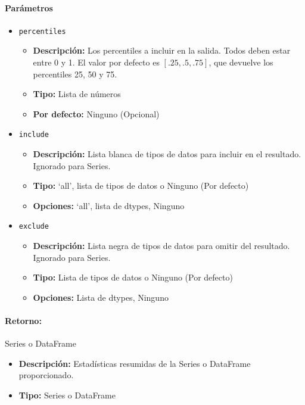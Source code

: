         \paragraph{\textbf{Parámetros}}
        \begin{itemize}
            \item \texttt{percentiles}
                \begin{itemize}
                    \item \textbf{Descripción:} Los percentiles a incluir en la salida. Todos deben estar entre 0 y 1. El valor por defecto es \([.25, .5, .75]\), que devuelve los percentiles 25, 50 y 75.
                    \item \textbf{Tipo:} Lista de números
                    \item \textbf{Por defecto:} Ninguno (Opcional)
                \end{itemize}
            \item \texttt{include}
                \begin{itemize}
                    \item \textbf{Descripción:} Lista blanca de tipos de datos para incluir en el resultado. Ignorado para Series.
                    \item \textbf{Tipo:} ‘all’, lista de tipos de datos o Ninguno (Por defecto)
                    \item \textbf{Opciones:} ‘all’, lista de dtypes, Ninguno
                \end{itemize}
            \item \texttt{exclude}
                \begin{itemize}
                    \item \textbf{Descripción:} Lista negra de tipos de datos para omitir del resultado. Ignorado para Series.
                    \item \textbf{Tipo:} Lista de tipos de datos o Ninguno (Por defecto)
                    \item \textbf{Opciones:} Lista de dtypes, Ninguno
                \end{itemize}
        \end{itemize}

        \paragraph{Retorno:} Series o DataFrame
        \begin{itemize}
            \item \textbf{Descripción:} Estadísticas resumidas de la Series o DataFrame proporcionado.
            \item \textbf{Tipo:} Series o DataFrame
        \end{itemize}


